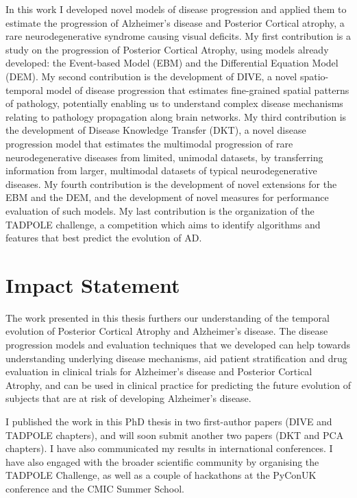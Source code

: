 \documentclass[12pt,a4paper,twoside]{book}
\begin{document}
In this work I developed novel models of disease progression and applied them to estimate the progression of Alzheimer's disease and Posterior Cortical atrophy, a rare neurodegenerative syndrome causing visual deficits. My first contribution is a study on the progression of Posterior Cortical Atrophy, using models already developed: the Event-based Model (EBM) and the Differential Equation Model (DEM). My second contribution is the development of DIVE, a novel spatio-temporal model of disease progression that estimates fine-grained spatial patterns of pathology, potentially enabling us to understand complex disease mechanisms relating to pathology propagation along brain networks. My third contribution is the development of Disease Knowledge Transfer (DKT), a novel disease progression model that estimates the multimodal progression of rare neurodegenerative diseases from limited, unimodal datasets, by transferring information from larger, multimodal datasets of typical neurodegenerative diseases. My fourth contribution is the development of novel extensions for the EBM and the DEM, and the development of novel measures for performance evaluation of such models. My last contribution is the organization of the TADPOLE challenge, a competition which aims to identify algorithms and features that best predict the evolution of AD. 

\chapter*{Impact Statement}
\thispagestyle{empty}

The work presented in this thesis furthers our understanding of the temporal evolution of Posterior Cortical Atrophy and Alzheimer's disease. The disease progression models and evaluation techniques that we developed can help towards understanding underlying disease mechanisms, aid patient stratification and drug evaluation in clinical trials for Alzheimer's disease and Posterior Cortical Atrophy, and can be used in clinical practice for predicting the future evolution of subjects that are at risk of developing Alzheimer's disease. 

I published the work in this PhD thesis in two first-author papers (DIVE and TADPOLE chapters), and will soon submit another two papers (DKT and PCA chapters). I have also communicated my results in international conferences. I have also engaged with the broader scientific community by organising the TADPOLE Challenge, as well as a couple of hackathons at the PyConUK conference and the CMIC Summer School.
\end{document}
